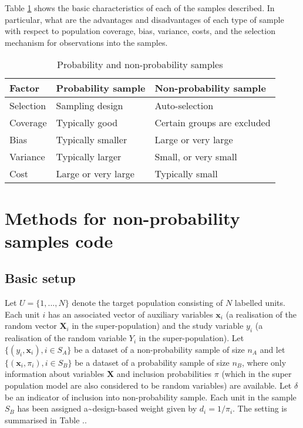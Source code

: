 \documentclass[
]{jss}
\begin{document}
Table \ref{tab:tabela1} shows the basic characteristics of each of the
samples described. In particular, what are the advantages and
disadvantages of each type of sample with respect to population
coverage, bias, variance, costs, and the selection mechanism for
observations into the samples.

\begin{table}
    \centering
    \caption{Probability and non-probability samples}
    \begin{tabular}{lll}
    \hline
    \textbf{Factor}     &  \textbf{Probability sample} & \textbf{Non-probability sample}\\
    \hline
    Selection     &  Sampling design & Auto-selection \\
    Coverage     &  Typically good & Certain groups are excluded \\
    Bias & Typically smaller & Large or very large \\
    Variance & Typically larger & Small, or very small \\
    Cost & Large or very large & Typically small \\
    \hline
    \end{tabular}
    \label{tab:tabela1}
\end{table}

\section[R code]{Methods for non-probability samples 
code}\label{r-code}

\hypertarget{basic-setup}{%
\subsection{Basic setup}\label{basic-setup}}

Let \(U=\{1,..., N\}\) denote the target population consisting of \(N\)
labelled units. Each unit \(i\) has an associated vector of auxiliary
variables \(\boldsymbol{x}_{i}\) (a realisation of the random vector
\(\boldsymbol{X}_{i}\) in the super-population) and the study variable
\(y_{i}\) (a realisation of the random variable \(Y_{i}\) in the
super-population). Let \(\{ (y_i, \boldsymbol{x}_i), i \in S_A\}\) be a
dataset of a non-probability sample of size \(n_A\) and let
\(\{\left(\boldsymbol{x}_i, \pi_{i}\right), i \in S_B\}\) be a dataset
of a probability sample of size \(n_B\), where only information about
variables \(\boldsymbol{X}\) and inclusion probabilities \(\pi\) (which
in the super population model are also considered to be random
variables) are available. Let \(\delta\) be an indicator of inclusion
into non-probability sample. Each unit in the sample \(S_B\) has been
assigned a\textasciitilde design-based weight given by
\(d_i = 1/\pi_i\). The setting is summarised in Table ..
\end{document}
